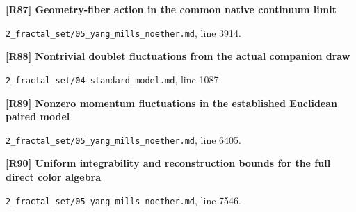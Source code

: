 \documentclass[11pt,a4paper]{article}
\begin{document}
\par\medskip\noindent\begin{minipage}{\linewidth}\textbf{[R87] Geometry-fiber action in the common native continuum limit}\label{src:thm-ym-native-fiber-continuum}\par
{\small\texttt{}\par
\nolinkurl{2_fractal_set/05_yang_mills_noether.md}, line 3914.\par}
\end{minipage}\par

\par\medskip\noindent\begin{minipage}{\linewidth}\textbf{[R88] Nontrivial doublet fluctuations from the actual companion draw}\label{src:thm-sm-native-doublet-fluctuations}\par
{\small\texttt{}\par
\nolinkurl{2_fractal_set/04_standard_model.md}, line 1087.\par}
\end{minipage}\par

\par\medskip\noindent\begin{minipage}{\linewidth}\textbf{[R89] Nonzero momentum fluctuations in the established Euclidean paired model}\label{src:cor-ym-paired-momentum-fluctuations}\par
{\small\texttt{}\par
\nolinkurl{2_fractal_set/05_yang_mills_noether.md}, line 6405.\par}
\end{minipage}\par

\par\medskip\noindent\begin{minipage}{\linewidth}\textbf{[R90] Uniform integrability and reconstruction bounds for the full direct color algebra}\label{src:lem-ym-physical-gauge-word-uniform-integrability}\par
{\small\texttt{}\par
\nolinkurl{2_fractal_set/05_yang_mills_noether.md}, line 7546.\par}
\end{minipage}\par
\end{document}
